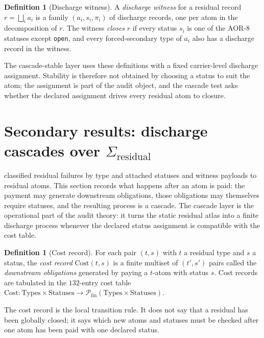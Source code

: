 \documentclass[11pt]{article}
\theoremstyle{definition}
\newtheorem{definition}[theorem]{Definition}
\begin{document}
\begin{definition}[Discharge witness]\label{def:aor:discharge-witness}
A \emph{discharge witness} for a residual record $r=\bigsqcup_i a_i$
is a family $(a_i,s_i,\pi_i)$ of discharge records, one per atom in
the decomposition of $r$.  The witness \emph{closes} $r$ if every
status $s_i$ is one of the AOR-8 statuses except \texttt{open}, and
every forced-secondary type of $a_i$ also has a discharge record in
the witness.
\end{definition}

The cascade-stable layer uses these definitions with a fixed
carrier-level discharge assignment.  Stability is therefore not
obtained by choosing a status to suit the atom; the assignment is part
of the audit object, and the cascade test asks whether the declared
assignment drives every residual atom to closure.
 \section{\texorpdfstring{Secondary results: discharge cascades over \(\Sigma_{\mathrm{residual}}\)}{Secondary results: discharge cascades over Sigma-residual}}\label{sec:aor-secondary-results}

 classified residual failures by type
and attached statuses and witness payloads to residual atoms.  This
section records what happens after an atom is paid: the payment may
generate downstream obligations, those obligations may themselves
require statuses, and the resulting process is a cascade.  The
cascade layer is the operational part of the audit theory: it turns
the static residual atlas into a finite discharge process whenever
the declared status assignment is compatible with the cost table.

\begin{definition}[Cost record]\label{def:aor:cost-record}
For each pair $(t,s)$ with $t$ a residual type and $s$ a status, the
\emph{cost record} $\mathrm{Cost}(t,s)$ is a finite multiset of
$(t',s')$ pairs called the \emph{downstream obligations} generated by
paying a $t$-atom with status $s$.  Cost records are tabulated in the
$132$-entry cost table $\mathrm{Cost}:\mathrm{Types}\times
\mathrm{Statuses}\to\mathcal P_{\mathrm{fin}}(\mathrm{Types}\times
\mathrm{Statuses})$.
\end{definition}

The cost record is the local transition rule.  It does not say that a
residual has been globally closed; it says which new atoms and statuses must
be checked after one atom has been paid with one declared status.
\end{document}
